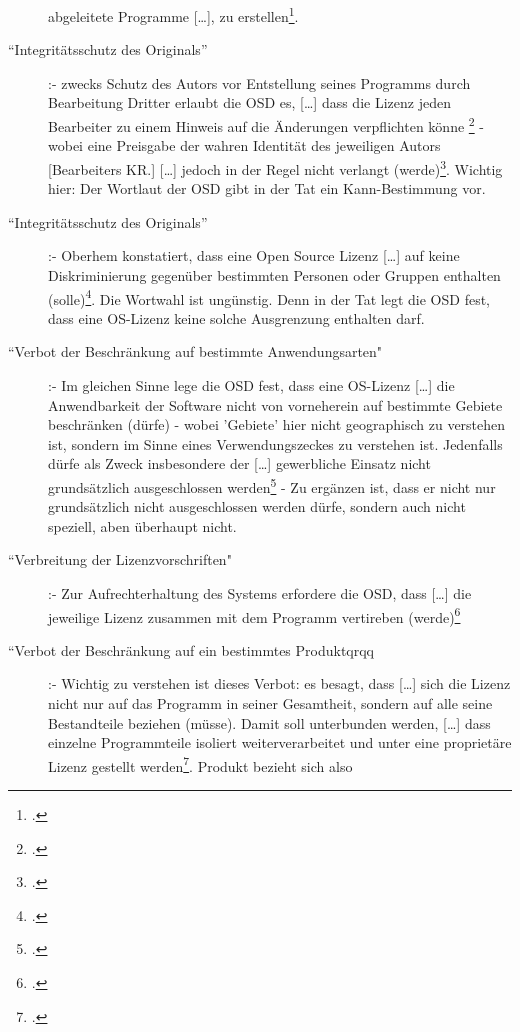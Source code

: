 \documentclass[DIV=calc,BCOR=5mm,11pt,headings=small,oneside,abstract=true, toc=bib]{scrartcl}
\begin{document}
\begin{description}
  abgeleitete Programme [\ldots], zu
  erstellen\grqq{}\footcite[vgl.][14]{Oberhem2008a}.
  \item[``Integritätsschutz des Originals''] :- zwecks Schutz des
  Autors vor \glqq{}Entstellung seines Programms durch Bearbeitung
  Dritter\grqq{} erlaubt die OSD es, \glqq{}[\ldots] dass die Lizenz
  jeden Bearbeiter zu einem Hinweis auf die Änderungen verpflichten könne
  \grqq{}\footcite[vgl.][14]{Oberhem2008a} - wobei \glqq{} eine Preisgabe
  der wahren Identität des jeweiligen Autors [Bearbeiters KR.] [\ldots]
  jedoch in der Regel nicht verlangt
  (werde)\grqq{}\footcite[vgl.][15]{Oberhem2008a}. Wichtig hier: Der Wortlaut
  der OSD gibt in der Tat ein Kann-Bestimmung vor.
  \item[``Integritätsschutz des Originals''] :- Oberhem konstatiert,
  dass eine Open Source Lizenz \glqq{}[\ldots] auf keine Diskriminierung
  gegenüber bestimmten Personen oder Gruppen enthalten
  (solle)\grqq{}\footcite[vgl.][15]{Oberhem2008a}. Die Wortwahl ist ungünstig.
  Denn in der Tat legt die OSD fest, dass eine OS-Lizenz keine solche
  Ausgrenzung enthalten darf.
  \item[``Verbot der Beschränkung auf bestimmte Anwendungsarten"] :-
  Im gleichen Sinne lege die OSD fest, dass eine OS-Lizenz \glqq{}[\ldots]
  die Anwendbarkeit der Software nicht von vorneherein auf bestimmte
  Gebiete beschränken (dürfe)\grqq{} - wobei 'Gebiete' hier nicht geographisch
  zu verstehen ist, sondern im Sinne eines Verwendungszeckes zu verstehen ist.
  Jedenfalls dürfe als Zweck insbesondere der \glqq{}[\ldots]
  gewerbliche Einsatz nicht grundsätzlich ausgeschlossen
  werden\grqq{}\footcite[vgl.][15]{Oberhem2008a} - Zu ergänzen ist, dass er
  nicht nur grundsätzlich nicht ausgeschlossen werden dürfe, sondern auch nicht
  speziell, aben überhaupt nicht.
  \item[``Verbreitung der Lizenzvorschriften"] :- Zur
  Aufrechterhaltung des Systems erfordere die OSD, dass \glqq{}[\ldots]
  die jeweilige Lizenz zusammen mit dem Programm vertireben
  (werde)\grqq{}\footcite[vgl.][16]{Oberhem2008a}
  \item[``Verbot der Beschränkung auf ein bestimmtes Produktqrqq{}] :-
  Wichtig zu verstehen ist dieses Verbot: es besagt, dass \glqq{}[\ldots]
  sich die Lizenz nicht nur auf das Programm in seiner Gesamtheit,
  sondern auf alle seine Bestandteile beziehen (müsse)\grqq{}. Damit soll
  unterbunden werden, \glqq{}[\ldots] dass einzelne Programmteile
  isoliert weiterverarbeitet und unter eine proprietäre Lizenz gestellt
  werden\grqq{}\footcite[vgl.][16]{Oberhem2008a}. Produkt bezieht sich also

\end{description}
\end{document}
